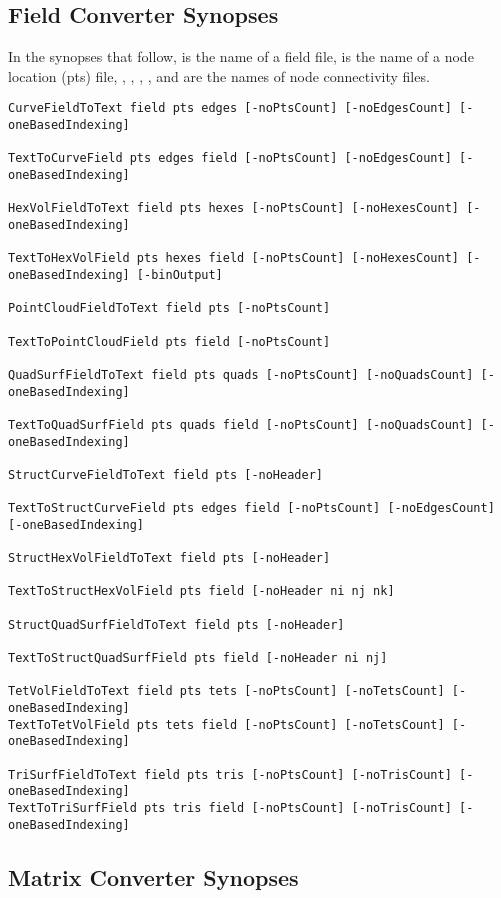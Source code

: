 \subsection{Field Converter Synopses}

In the synopses that follow,  is the name of a \sr{}
field file,  is the name of a node location (pts) file,
, , , , and
 are the names of node connectivity files.

\begin{verbatim}
CurveFieldToText field pts edges [-noPtsCount] [-noEdgesCount] [-oneBasedIndexing]

TextToCurveField pts edges field [-noPtsCount] [-noEdgesCount] [-oneBasedIndexing]

HexVolFieldToText field pts hexes [-noPtsCount] [-noHexesCount] [-oneBasedIndexing]

TextToHexVolField pts hexes field [-noPtsCount] [-noHexesCount] [-oneBasedIndexing] [-binOutput]

PointCloudFieldToText field pts [-noPtsCount]

TextToPointCloudField pts field [-noPtsCount]

QuadSurfFieldToText field pts quads [-noPtsCount] [-noQuadsCount] [-oneBasedIndexing]

TextToQuadSurfField pts quads field [-noPtsCount] [-noQuadsCount] [-oneBasedIndexing]

StructCurveFieldToText field pts [-noHeader]

TextToStructCurveField pts edges field [-noPtsCount] [-noEdgesCount] [-oneBasedIndexing]

StructHexVolFieldToText field pts [-noHeader]

TextToStructHexVolField pts field [-noHeader ni nj nk]

StructQuadSurfFieldToText field pts [-noHeader]

TextToStructQuadSurfField pts field [-noHeader ni nj]

TetVolFieldToText field pts tets [-noPtsCount] [-noTetsCount] [-oneBasedIndexing]
TextToTetVolField pts tets field [-noPtsCount] [-noTetsCount] [-oneBasedIndexing]

TriSurfFieldToText field pts tris [-noPtsCount] [-noTrisCount] [-oneBasedIndexing]
TextToTriSurfField pts tris field [-noPtsCount] [-noTrisCount] [-oneBasedIndexing]
\end{verbatim}


\subsection{Matrix Converter Synopses}

